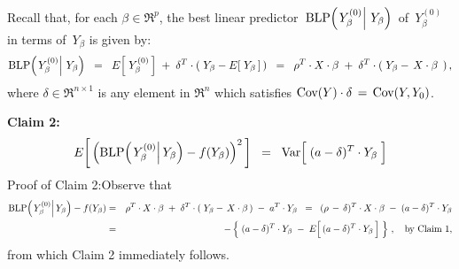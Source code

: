 \begin{enumerate}
	\vskip 0.8cm
	\noindent
	Recall that, for each $\beta \in \Re^{p}$, the best linear predictor
	\,$\textnormal{BLP}\!\left(\left.Y^{(0)}_{\beta}\right\vert\,Y_{\beta}\right)$\, of
	\,$Y^{(0)}_{\beta}$ in terms of \,$Y_{\beta}$ is given by:
	\begin{equation*}
	\textnormal{BLP}\!\left(\left.Y^{(0)}_{\beta}\right\vert\,Y_{\beta}\right)
	\;\; = \;\;
		E\!\left[\;Y^{(0)}_{\beta}\,\right] \; + \; \delta^{T}\cdot(\;Y_{\beta} - E\!\left[\;Y_{\beta}\,\right]\,)
	\;\; = \;\;
		\rho^{T}\cdot X \cdot\beta \; + \; \delta^{T}\cdot(\;Y_{\beta} - \,X\cdot\beta\,\;)\,,
	\end{equation*}
	where $\delta \in \Re^{n \times 1}$ is any element in $\Re^{n}$ which satisfies
	$\textnormal{Cov}(Y) \cdot \delta \,=\, \textnormal{Cov}(Y,Y_{0})$.

	\vskip 0.8cm
	\noindent
	\textbf{Claim 2:}
	\begin{equation*}
	E\!\left[\,\left(\blp\!\left(\left.Y^{(0)}_{\beta}\right\vert Y_{\beta}\right) \overset{{\color{white}.}}{-} f(Y_{\beta})\right)^{2}\,\right]
	\;\; = \;\;
		\Var\!\left[\;(a \overset{{\color{white}.}}{-} \delta)^{T}\cdot Y_{\beta}\;\right]
	\end{equation*}
	Proof of Claim 2:\quad Observe that
	\begin{eqnarray*}
	\blp\!\left(\left.Y^{(0)}_{\beta}\right\vert Y_{\beta}\right) - f(Y_{\beta})
	&=&
		\rho^{T} \cdot X \cdot \beta \; + \; \delta^{T}\cdot(\;Y_{\beta} - \,X\cdot\beta\,) \; - \; a^{T} \cdot Y_{\beta}
	\;\; = \;\;
		(\rho \, - \, \delta)^{T} \cdot X \cdot \beta \; - \; (a - \delta)^{T} \cdot Y_{\beta}
	\\
	&=&
		- \left\{\;
			(a - \delta)^{T} \cdot Y_{\beta} \; - \; E\!\left[\,(a \overset{{\color{white}.}}{-} \delta)^{T} \cdot Y_{\beta}\,\right]
			 \;\right\}\,,
		\quad\textnormal{by Claim 1},
	\end{eqnarray*}
	from which Claim 2 immediately follows.


\end{enumerate}
